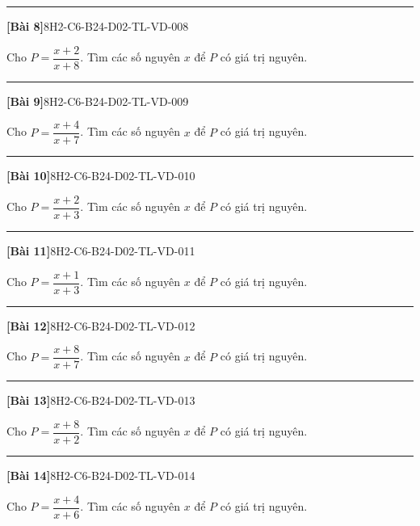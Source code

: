 \documentclass[12pt,a4paper]{article}
\newif\ifloigiai
\newenvironment{cauhoi}[2]{%
  \par\medskip\noindent\rule{\textwidth}{0.4pt}\par\nopagebreak
  \noindent\textbf{[#1]}\hfill{\scriptsize\ttfamily #2}\par\nopagebreak\smallskip}{\par}
\newcommand{\loigiai}[1]{\ifloigiai\par\smallskip\noindent\textit{Lời giải.} #1\par\fi}
\begin{document}
\begin{cauhoi}{Bài 8}{8H2-C6-B24-D02-TL-VD-008}
Cho $P=\dfrac{x+2}{x+8}$. Tìm các số nguyên $x$ để $P$ có giá trị nguyên.
\loigiai{Viết $P=\dfrac{(x+8)-6}{x+8}=1+\dfrac{-6}{x+8}$. $P$ nguyên khi $x+8$ là ước của $-6$, tức $x+8\in\{-6; -3; -2; -1; 1; 2; 3; 6\}$. Suy ra $x\in\{-14; -11; -10; -9; -7; -6; -5; -2\}$.}
\end{cauhoi}
\begin{cauhoi}{Bài 9}{8H2-C6-B24-D02-TL-VD-009}
Cho $P=\dfrac{x+4}{x+7}$. Tìm các số nguyên $x$ để $P$ có giá trị nguyên.
\loigiai{Viết $P=\dfrac{(x+7)-3}{x+7}=1+\dfrac{-3}{x+7}$. $P$ nguyên khi $x+7$ là ước của $-3$, tức $x+7\in\{-3; -1; 1; 3\}$. Suy ra $x\in\{-10; -8; -6; -4\}$.}
\end{cauhoi}
\begin{cauhoi}{Bài 10}{8H2-C6-B24-D02-TL-VD-010}
Cho $P=\dfrac{x+2}{x+3}$. Tìm các số nguyên $x$ để $P$ có giá trị nguyên.
\loigiai{Viết $P=\dfrac{(x+3)-1}{x+3}=1+\dfrac{-1}{x+3}$. $P$ nguyên khi $x+3$ là ước của $-1$, tức $x+3\in\{-1; 1\}$. Suy ra $x\in\{-4; -2\}$.}
\end{cauhoi}
\begin{cauhoi}{Bài 11}{8H2-C6-B24-D02-TL-VD-011}
Cho $P=\dfrac{x+1}{x+3}$. Tìm các số nguyên $x$ để $P$ có giá trị nguyên.
\loigiai{Viết $P=\dfrac{(x+3)-2}{x+3}=1+\dfrac{-2}{x+3}$. $P$ nguyên khi $x+3$ là ước của $-2$, tức $x+3\in\{-2; -1; 1; 2\}$. Suy ra $x\in\{-5; -4; -2; -1\}$.}
\end{cauhoi}
\begin{cauhoi}{Bài 12}{8H2-C6-B24-D02-TL-VD-012}
Cho $P=\dfrac{x+8}{x+7}$. Tìm các số nguyên $x$ để $P$ có giá trị nguyên.
\loigiai{Viết $P=\dfrac{(x+7)+1}{x+7}=1+\dfrac{1}{x+7}$. $P$ nguyên khi $x+7$ là ước của $1$, tức $x+7\in\{-1; 1\}$. Suy ra $x\in\{-8; -6\}$.}
\end{cauhoi}
\begin{cauhoi}{Bài 13}{8H2-C6-B24-D02-TL-VD-013}
Cho $P=\dfrac{x+8}{x+2}$. Tìm các số nguyên $x$ để $P$ có giá trị nguyên.
\loigiai{Viết $P=\dfrac{(x+2)+6}{x+2}=1+\dfrac{6}{x+2}$. $P$ nguyên khi $x+2$ là ước của $6$, tức $x+2\in\{-6; -3; -2; -1; 1; 2; 3; 6\}$. Suy ra $x\in\{-8; -5; -4; -3; -1; 0; 1; 4\}$.}
\end{cauhoi}
\begin{cauhoi}{Bài 14}{8H2-C6-B24-D02-TL-VD-014}
Cho $P=\dfrac{x+4}{x+6}$. Tìm các số nguyên $x$ để $P$ có giá trị nguyên.
\loigiai{Viết $P=\dfrac{(x+6)-2}{x+6}=1+\dfrac{-2}{x+6}$. $P$ nguyên khi $x+6$ là ước của $-2$, tức $x+6\in\{-2; -1; 1; 2\}$. Suy ra $x\in\{-8; -7; -5; -4\}$.}
\end{cauhoi}
\end{document}
